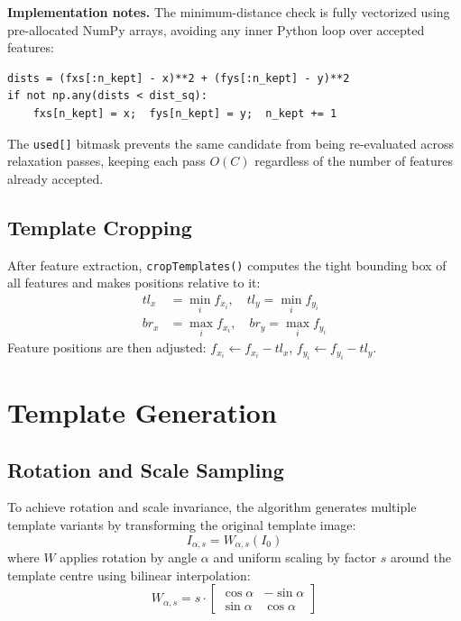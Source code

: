 \documentclass[12pt,a4paper]{article}
\begin{document}
\textbf{Implementation notes.}
The minimum-distance check is fully vectorized using pre-allocated NumPy arrays,
avoiding any inner Python loop over accepted features:
\begin{lstlisting}[style=python, caption={Vectorized minimum-distance check}]
dists = (fxs[:n_kept] - x)**2 + (fys[:n_kept] - y)**2
if not np.any(dists < dist_sq):
    fxs[n_kept] = x;  fys[n_kept] = y;  n_kept += 1
\end{lstlisting}
The \texttt{used[]} bitmask prevents the same candidate from being re-evaluated
across relaxation passes, keeping each pass $O(C)$ regardless of the number of
features already accepted.

\subsection{Template Cropping}
After feature extraction, \texttt{cropTemplates()} computes the tight bounding box
of all features and makes positions relative to it:
\begin{align}
  tl_x &= \min_i f_{x_i}, \quad tl_y = \min_i f_{y_i} \\
  br_x &= \max_i f_{x_i}, \quad br_y = \max_i f_{y_i}
\end{align}
Feature positions are then adjusted:
$f_{x_i} \leftarrow f_{x_i} - tl_x$,\; $f_{y_i} \leftarrow f_{y_i} - tl_y$.

\section{Template Generation}

\subsection{Rotation and Scale Sampling}
To achieve rotation and scale invariance, the algorithm generates multiple template
variants by transforming the original template image:
\begin{equation}
  I_{\alpha,s} = W_{\alpha,s}(I_0)
\end{equation}
where $W$ applies rotation by angle $\alpha$ and uniform scaling by factor $s$ around
the template centre using bilinear interpolation:
\begin{equation}
  W_{\alpha,s} = s\cdot\begin{bmatrix} \cos\alpha & -\sin\alpha \\
                                        \sin\alpha &  \cos\alpha \end{bmatrix}
\end{equation}
\end{document}
